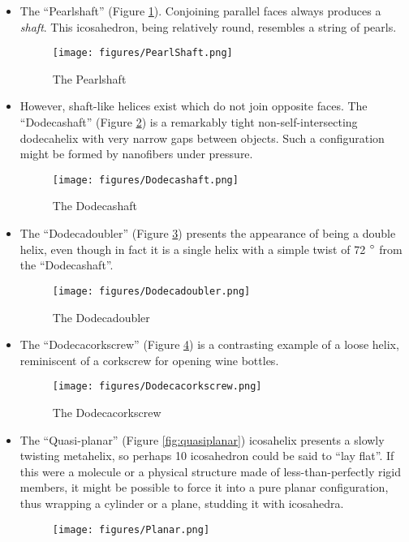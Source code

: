 \documentclass[11pt]{article}
\begin{document}
{\begin{itemize}
\item The ``Pearlshaft'' (Figure \ref{fig:pearlshaft}). Conjoining parallel faces always produces a {\em shaft}. This icosahedron, being relatively round,
  resembles a string of pearls.
\begin{figure}
     \centering
     \texttt{[image: figures/PearlShaft.png]}
     \caption{The Pearlshaft}
  \label{fig:pearlshaft}
\end{figure}

\item However, shaft-like helices exist which do not join opposite faces. The ``Dodecashaft'' (Figure \ref{fig:dodecashaft}) is a remarkably tight
  non-self-intersecting dodecahelix with very narrow gaps between objects.
  Such a configuration
  might be formed by nanofibers under pressure.
\begin{figure}
     \centering
     \texttt{[image: figures/Dodecashaft.png]}
     \caption{The Dodecashaft}
  \label{fig:dodecashaft}
\end{figure}
\item The ``Dodecadoubler'' (Figure \ref{fig:dodecadoubler}) presents the appearance of being a double helix, even though in fact it is a single helix with
  a simple twist of 72 $\degree$ from the ``Dodecashaft''.
\begin{figure}
     \centering
     \texttt{[image: figures/Dodecadoubler.png]}
     \caption{The Dodecadoubler}
  \label{fig:dodecadoubler}
\end{figure}
\item The ``Dodecacorkscrew'' (Figure \ref{fig:dodecacorkscrew}) is a contrasting example of a loose helix, reminiscent of a corkscrew for opening wine bottles.
\begin{figure}
     \centering
     \texttt{[image: figures/Dodecacorkscrew.png]}
     \caption{The Dodecacorkscrew}
  \label{fig:dodecacorkscrew}
\end{figure}
\item The ``Quasi-planar'' (Figure \ref{fig:quasiplanar}) icosahelix presents a slowly twisting metahelix, so perhaps 10 icosahedron could be said to ``lay flat''. If this were
  a molecule or a physical structure made of less-than-perfectly rigid members, it might be possible to force it into a pure planar configuration,
  thus wrapping a cylinder or a plane, studding it with icosahedra.
\begin{figure}
     \centering
     \texttt{[image: figures/Planar.png]}

\end{figure}
\end{itemize}}
\end{document}
